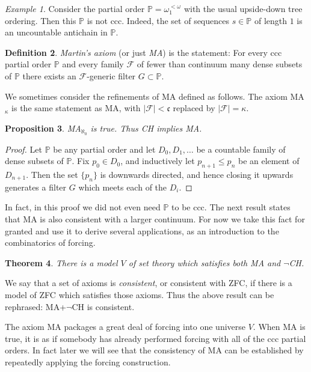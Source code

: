 \documentclass[11pt,oneside,a4paper]{amsbook}
\newcommand{\PP}{\mathbb P}
\theoremstyle{definition}
\theoremstyle{plain}
\newtheorem{theorem}{Theorem}[section]
\newtheorem{proposition}[theorem]{Proposition}
\theoremstyle{definition}
\newtheorem{definition}[theorem]{Definition}
\theoremstyle{remark}
\newtheorem{example}[theorem]{Example}
\numberwithin{equation}{section}
\numberwithin{figure}{section}
\begin{document}
\begin{example}
  Consider the partial order $\PP=\omega_1^{<\omega}$ with the usual upside-down tree ordering. Then this $\PP$ is not ccc. Indeed, the set of sequences $s\in\PP$ of length $1$ is an uncountable antichain in $\PP$.
\end{example}

\begin{definition}
  \emph{Martin's axiom} (or just \emph{MA}) is the statement: For every ccc partial order $\PP$ and every family $\mathcal F$ of fewer than continuum many dense subsets of $\PP$ there exists an $\mathcal F$-generic filter $G\subset\PP$.
\end{definition}

We sometimes consider the refinements of MA defined as follows. The axiom MA$_\kappa$ is the same statement as MA, with $|\mathcal F|<\mathfrak c$ replaced by $|\mathcal F|=\kappa$.

\begin{proposition}
  \label{prop:ma-aleph0}
  MA$_{\aleph_0}$ is true. Thus CH implies MA.
\end{proposition}

\begin{proof}
  Let $\PP$ be any partial order and let $D_0,D_1,\ldots$ be a countable family of dense subsets of $\PP$. Fix $p_0\in D_0$, and inductively let $p_{n+1}\leq p_n$ be an element of $D_{n+1}$. Then the set $\{p_n\}$ is downwards directed, and hence closing it upwards generates a filter $G$ which meets each of the $D_i$.
\end{proof}

In fact, in this proof we did not even need $\PP$ to be ccc. The next result states that MA is also consistent with a larger continuum. For now we take this fact for granted and use it to derive several applications, as an introduction to the combinatorics of forcing.

\begin{theorem}
  There is a model $V$ of set theory which satisfies both MA and $\neg$CH.
\end{theorem}

We say that a set of axioms is \emph{consistent}, or consistent with ZFC, if there is a model of ZFC which satisfies those axioms. Thus the above result can be rephrased: MA+$\neg$CH is consistent.

The axiom MA packages a great deal of forcing into one universe $V$. When MA is true, it is as if somebody has already performed forcing with all of the ccc partial orders. In fact later we will see that the consistency of MA can be established by repeatedly applying the forcing construction.
\end{document}
